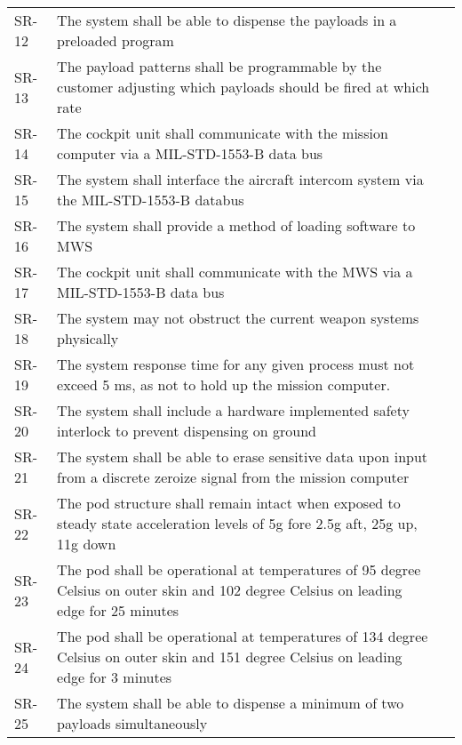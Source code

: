 \documentclass[Main]{subfiles}
\begin{document}
\begin{longtable}{p{} p{} p{}}
SR-12 & The system shall be able to dispense the payloads in a preloaded program &  \\

SR-13 & The payload patterns shall be programmable by the customer adjusting which payloads should be fired at which rate &  \\

SR-14 & The cockpit unit shall communicate with the mission computer via a MIL-STD-1553-B data bus &  \\

SR-15 & The system shall interface the aircraft intercom system via the MIL-STD-1553-B databus &  \\

SR-16 & The system shall provide a method of loading software to MWS &  \\

SR-17 & The cockpit unit shall communicate with the MWS via a MIL-STD-1553-B data bus &  \\

SR-18 & The system may not obstruct the current weapon systems physically &  \\

SR-19 & The system response time for any given process must not exceed 5 ms, as not to hold up the mission computer. &  \\

SR-20 & The system shall include a hardware implemented safety interlock to prevent dispensing on ground &  \\

SR-21 & The system shall be able to erase sensitive data upon input from a discrete zeroize signal from the mission computer &  \\

SR-22 &  The pod structure shall remain intact when exposed to steady state acceleration levels of 5g fore 2.5g aft, 25g up, 11g down &  \\

SR-23 &  The pod shall be operational at temperatures of 95 degree Celsius on outer skin and 102 degree Celsius on leading edge for 25 minutes &  \\

SR-24 &  The pod shall be operational at temperatures of 134 degree Celsius on outer skin and 151 degree Celsius on leading edge for 3 minutes &  \\

SR-25 & The system shall be able to dispense a minimum of two payloads simultaneously  &  \\


\end{longtable}
\end{document}
